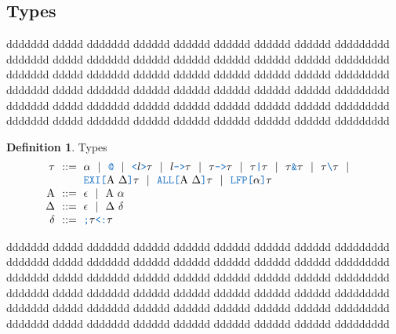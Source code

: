 \documentclass[acmsmall]{acmart}
\theoremstyle{definition}
\newtheorem{definition}{Definition}[section]
\begin{document}
\subsection{Types}

  ddddddd ddddd ddddddd dddddd dddddd dddddd dddddd dddddd ddddddddd   
  ddddddd ddddd ddddddd dddddd dddddd dddddd dddddd dddddd ddddddddd 
  ddddddd ddddd ddddddd dddddd dddddd dddddd dddddd dddddd ddddddddd 
  ddddddd ddddd ddddddd dddddd dddddd dddddd dddddd dddddd ddddddddd 
  ddddddd ddddd ddddddd dddddd dddddd dddddd dddddd dddddd ddddddddd 
  ddddddd ddddd ddddddd dddddd dddddd dddddd dddddd dddddd ddddddddd 

\begin{definition} Types 
  \label{definition:types}
  \[\begin{array}[t]{r@{}l}
    \nonterm{\tau} & \is 
    \begin{array}[t]{@{}l}
      \alpha \sep
      \obj{@} \sep
      \obj{<}l\obj{>}\tau \sep 
      l\obj{->}\tau \sep 
      \tau\obj{->}\tau \sep 
      \tau\obj{|}\tau \sep 
      \tau\obj{\&}\tau \sep 
      \tau\obj{\textbackslash}\tau \sep 
      \\
      \obj{EXI[}\Alpha \ \Delta \obj{]} \tau \sep 
      \obj{ALL[}\Alpha \ \Delta \obj{]} \tau \sep 
      \obj{LFP[}\alpha\obj{]}\tau
    \end{array}
    \\
    \nonterm{\Alpha} & \is \epsilon \sep \Alpha\ \alpha 
    \\
    \nonterm{\Delta} & \is \epsilon \sep \Delta\ \delta
    \\
    \nonterm{\delta} & \is \obj{;} \tau \obj{<:} \tau
  \end{array}\]
\end{definition}

  ddddddd ddddd ddddddd dddddd dddddd dddddd dddddd dddddd ddddddddd   
  ddddddd ddddd ddddddd dddddd dddddd dddddd dddddd dddddd ddddddddd 
  ddddddd ddddd ddddddd dddddd dddddd dddddd dddddd dddddd ddddddddd 
  ddddddd ddddd ddddddd dddddd dddddd dddddd dddddd dddddd ddddddddd 
  ddddddd ddddd ddddddd dddddd dddddd dddddd dddddd dddddd ddddddddd 
  ddddddd ddddd ddddddd dddddd dddddd dddddd dddddd dddddd ddddddddd 
\end{document}
